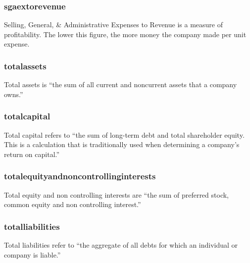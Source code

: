 \subsubsection{sgaextorevenue}
Selling, General, \& Administrative Expenses to Revenue is a measure of profitability. The lower this figure, the more money the company made per unit expense. \cite{sgaextorevenue}

\subsubsection{totalassets}
Total assets is ``the sum of all current and noncurrent assets that a company owns.''\cite{intrinioDataTags}

\subsubsection{totalcapital}
Total capital refers to ``the sum of long-term debt and total shareholder equity. This is a calculation that is traditionally used when determining a company's return on capital.''\cite{intrinioDataTags}

\subsubsection{totalequityandnoncontrollinginterests}
Total equity and non controlling interests are ``the sum of preferred stock, common equity and non controlling interest.''\cite{intrinioDataTags}

\subsubsection{totalliabilities}
Total liabilities refer to ``the aggregate of all debts for which an individual or company is liable.'' \cite{totalLiabilities}